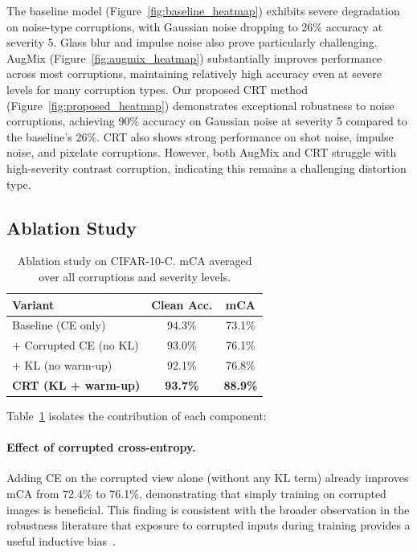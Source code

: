 \documentclass[10pt,twocolumn]{article}
\begin{document}
The baseline model (Figure~\ref{fig:baseline_heatmap}) exhibits severe degradation on noise-type corruptions, with Gaussian noise dropping to 26\% accuracy at severity 5. Glass blur and impulse noise also prove particularly challenging. AugMix (Figure~\ref{fig:augmix_heatmap}) substantially improves performance across most corruptions, maintaining relatively high accuracy even at severe levels for many corruption types. Our proposed CRT method (Figure~\ref{fig:proposed_heatmap}) demonstrates exceptional robustness to noise corruptions, achieving 90\% accuracy on Gaussian noise at severity 5 compared to the baseline's 26\%. CRT also shows strong performance on shot noise, impulse noise, and pixelate corruptions. However, both AugMix and CRT struggle with high-severity contrast corruption, indicating this remains a challenging distortion type.

\subsection{Ablation Study}

\begin{table}[t]
\centering
\caption{Ablation study on CIFAR-10-C. mCA averaged over all corruptions and severity levels.}
\label{tab:ablation}
\begin{tabular}{lcc}
\toprule
\textbf{Variant} & \textbf{Clean Acc.} & \textbf{mCA} \\
\midrule
Baseline (CE only)              & 94.3\%              & 73.1\%       \\
$+$ Corrupted CE (no KL)        & 93.0\%              & 76.1\%       \\
$+$ KL (no warm-up)             & 92.1\%              & 76.8\%       \\
\textbf{CRT (KL + warm-up)}     & \textbf{93.7\%}     & \textbf{88.9\%} \\
\bottomrule
\end{tabular}
\end{table}

Table~\ref{tab:ablation} isolates the contribution of each component:

\paragraph{Effect of corrupted cross-entropy.} Adding CE on the corrupted view alone (without any KL term) already improves mCA from 72.4\% to 76.1\%, demonstrating that simply training on corrupted images is beneficial. This finding is consistent with the broader observation in the robustness literature that exposure to corrupted inputs during training provides a useful inductive bias~\cite{erichson2024noisymix,kumar2026demhec}.
\end{document}
